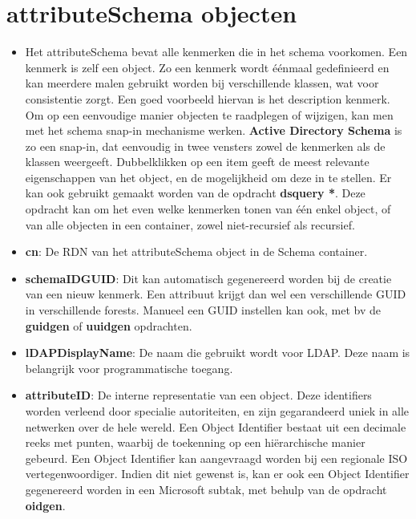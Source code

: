 	\section{attributeSchema objecten }
	\begin{enumerate}
		 { 
			\begin{itemize}
				\item Het attributeSchema bevat alle kenmerken die in het schema voorkomen. Een kenmerk is zelf een object. Zo een kenmerk wordt éénmaal gedefinieerd en kan meerdere malen gebruikt worden bij verschillende klassen, wat voor consistentie zorgt. Een goed voorbeeld hiervan is het description kenmerk. Om op een eenvoudige manier objecten te raadplegen of wijzigen, kan men met het schema snap-in mechanisme werken. \textbf{Active Directory Schema} is zo een snap-in, dat eenvoudig in twee vensters zowel de kenmerken als de klassen weergeeft. Dubbelklikken op een item geeft de meest relevante eigenschappen van het object, en de mogelijkheid om deze in te stellen. Er kan ook gebruikt gemaakt worden van de opdracht \textbf{dsquery *}. Deze opdracht kan om het even welke kenmerken tonen van één enkel object, of van alle objecten in een container, zowel niet-recursief als recursief.
			\end{itemize}
		}
		
		 { 
			\begin{itemize}
				\item \textbf{cn}: De RDN van het attributeSchema object in de Schema container.
				\item \textbf{schemaIDGUID}: Dit kan automatisch gegenereerd worden bij de creatie van een nieuw kenmerk. Een attribuut krijgt dan wel een verschillende GUID in verschillende forests. Manueel een GUID instellen kan ook, met bv de \textbf{guidgen} of \textbf{uuidgen} opdrachten.
				\item \textbf{lDAPDisplayName}: De naam die gebruikt wordt voor LDAP. Deze naam is belangrijk voor programmatische toegang.
				\item \textbf{attributeID}: De interne representatie van een object. Deze identifiers worden verleend door specialie autoriteiten, en zijn gegarandeerd uniek in alle netwerken over de hele wereld. Een Object Identifier bestaat uit een decimale reeks met punten, waarbij de toekenning op een hiërarchische manier gebeurd. Een Object Identifier kan aangevraagd worden bij een regionale ISO vertegenwoordiger. Indien dit niet gewenst is, kan er ook een Object Identifier gegenereerd worden in een Microsoft subtak, met behulp van de opdracht \textbf{oidgen}.
			\end{itemize}
		}
		

\end{enumerate}

